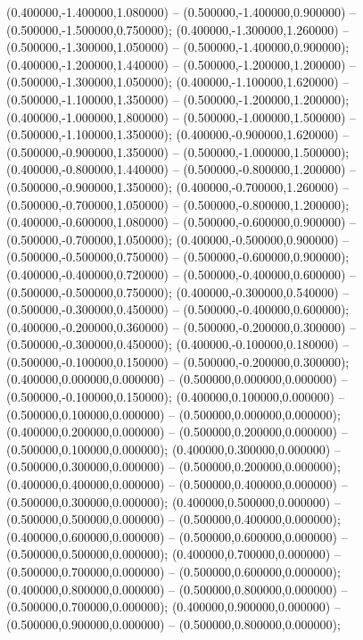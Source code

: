  (0.400000,-1.400000,1.080000) -- (0.500000,-1.400000,0.900000) -- (0.500000,-1.500000,0.750000);
 (0.400000,-1.300000,1.260000) -- (0.500000,-1.300000,1.050000) -- (0.500000,-1.400000,0.900000);
 (0.400000,-1.200000,1.440000) -- (0.500000,-1.200000,1.200000) -- (0.500000,-1.300000,1.050000);
 (0.400000,-1.100000,1.620000) -- (0.500000,-1.100000,1.350000) -- (0.500000,-1.200000,1.200000);
 (0.400000,-1.000000,1.800000) -- (0.500000,-1.000000,1.500000) -- (0.500000,-1.100000,1.350000);
 (0.400000,-0.900000,1.620000) -- (0.500000,-0.900000,1.350000) -- (0.500000,-1.000000,1.500000);
 (0.400000,-0.800000,1.440000) -- (0.500000,-0.800000,1.200000) -- (0.500000,-0.900000,1.350000);
 (0.400000,-0.700000,1.260000) -- (0.500000,-0.700000,1.050000) -- (0.500000,-0.800000,1.200000);
 (0.400000,-0.600000,1.080000) -- (0.500000,-0.600000,0.900000) -- (0.500000,-0.700000,1.050000);
 (0.400000,-0.500000,0.900000) -- (0.500000,-0.500000,0.750000) -- (0.500000,-0.600000,0.900000);
 (0.400000,-0.400000,0.720000) -- (0.500000,-0.400000,0.600000) -- (0.500000,-0.500000,0.750000);
 (0.400000,-0.300000,0.540000) -- (0.500000,-0.300000,0.450000) -- (0.500000,-0.400000,0.600000);
 (0.400000,-0.200000,0.360000) -- (0.500000,-0.200000,0.300000) -- (0.500000,-0.300000,0.450000);
 (0.400000,-0.100000,0.180000) -- (0.500000,-0.100000,0.150000) -- (0.500000,-0.200000,0.300000);
 (0.400000,0.000000,0.000000) -- (0.500000,0.000000,0.000000) -- (0.500000,-0.100000,0.150000);
 (0.400000,0.100000,0.000000) -- (0.500000,0.100000,0.000000) -- (0.500000,0.000000,0.000000);
 (0.400000,0.200000,0.000000) -- (0.500000,0.200000,0.000000) -- (0.500000,0.100000,0.000000);
 (0.400000,0.300000,0.000000) -- (0.500000,0.300000,0.000000) -- (0.500000,0.200000,0.000000);
 (0.400000,0.400000,0.000000) -- (0.500000,0.400000,0.000000) -- (0.500000,0.300000,0.000000);
 (0.400000,0.500000,0.000000) -- (0.500000,0.500000,0.000000) -- (0.500000,0.400000,0.000000);
 (0.400000,0.600000,0.000000) -- (0.500000,0.600000,0.000000) -- (0.500000,0.500000,0.000000);
 (0.400000,0.700000,0.000000) -- (0.500000,0.700000,0.000000) -- (0.500000,0.600000,0.000000);
 (0.400000,0.800000,0.000000) -- (0.500000,0.800000,0.000000) -- (0.500000,0.700000,0.000000);
 (0.400000,0.900000,0.000000) -- (0.500000,0.900000,0.000000) -- (0.500000,0.800000,0.000000);
